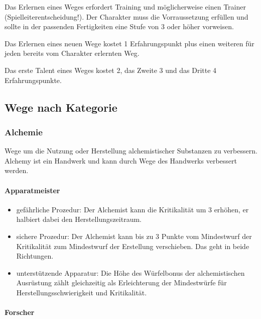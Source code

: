 \documentclass{article}
\begin{document}
Das Erlernen eines Weges erfordert Training und möglicherweise einen Trainer (Spielleiterentscheidung!). Der
Charakter muss die Vorraussetzung erfüllen und sollte in der passenden Fertigkeiten eine Stufe von 3 oder höher
vorweisen.

Das Erlernen eines neuen Wege kostet 1 Erfahrungspunkt plus einen weiteren für jeden bereits vom Charakter erlernten
Weg.

Das erste Talent eines Weges kostet 2, das Zweite 3 und das Dritte 4 Erfahrungspunkte.

\begin{center}
\subsection{Wege nach Kategorie}
\end{center}

\subsubsection{Alchemie}

Wege um die Nutzung oder Herstellung alchemistischer Substanzen zu verbessern. Alchemy ist ein Handwerk und kann
durch Wege des Handwerks verbessert werden.

\paragraph{Apparatmeister}

\begin{itemize}
\item gefährliche Prozedur: Der Alchemist kann die Kritikalität um 3 erhöhen, er halbiert dabei den Herstellungszeitraum.
\item sichere Prozedur: Der Alchemist kann bis zu 3 Punkte vom Mindestwurf der Kritikalität zum Mindestwurf der Erstellung verschieben. Das geht in beide Richtungen.
\item unterstützende Apparatur: Die Höhe des Würfelbonus der alchemistischen Ausrüstung zählt gleichzeitig als Erleichterung der Mindestwürfe für Herstellungsschwierigkeit und Kritikalität.
\end{itemize}

\paragraph{Forscher}
\end{document}

